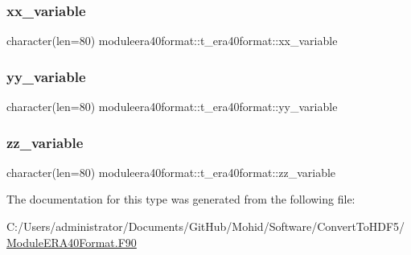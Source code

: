 \subsubsection{\texorpdfstring{xx\+\_\+variable}{xx\_variable}}
{\footnotesize\ttfamily character(len=80) moduleera40format\+::t\+\_\+era40format\+::xx\+\_\+variable\hspace{0.3cm}{\ttfamily [private]}}

\mbox{\label{structmoduleera40format_1_1t__era40format_ac957655400c91e6abcaa59ab6def87f9}} 
\subsubsection{\texorpdfstring{yy\+\_\+variable}{yy\_variable}}
{\footnotesize\ttfamily character(len=80) moduleera40format\+::t\+\_\+era40format\+::yy\+\_\+variable\hspace{0.3cm}{\ttfamily [private]}}

\mbox{\label{structmoduleera40format_1_1t__era40format_a84ccd09939682702a41e3923a3c4a672}} 
\subsubsection{\texorpdfstring{zz\+\_\+variable}{zz\_variable}}
{\footnotesize\ttfamily character(len=80) moduleera40format\+::t\+\_\+era40format\+::zz\+\_\+variable\hspace{0.3cm}{\ttfamily [private]}}



The documentation for this type was generated from the following file\+:\begin{DoxyCompactItemize}
\item 
C\+:/\+Users/administrator/\+Documents/\+Git\+Hub/\+Mohid/\+Software/\+Convert\+To\+H\+D\+F5/\mbox{\hyperlink{_module_e_r_a40_format_8_f90}{Module\+E\+R\+A40\+Format.\+F90}}\end{DoxyCompactItemize}
